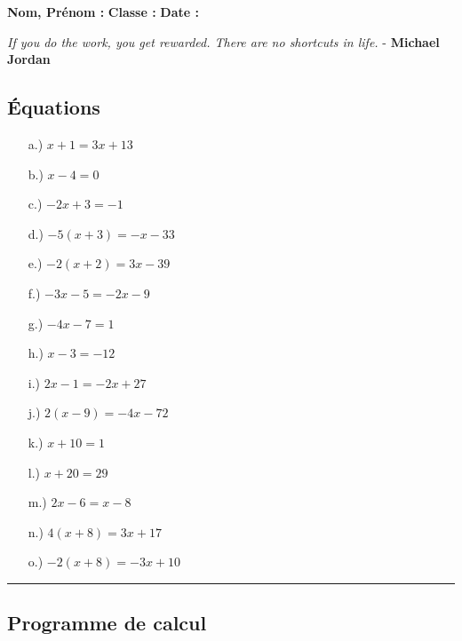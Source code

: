 \documentclass[11pt]{article}
\newcommand{\horrule}[1]{\rule{\linewidth}{#1}} %
\begin{document}
\newpage

\textbf{Nom, Prénom :} \hspace{8cm} \textbf{Classe :} \hspace{3cm} \textbf{Date :}\\
\vspace{-0.8cm}
\begin{center}
  \textit{If you do the work, you get rewarded. There are no shortcuts in life.}  - \textbf{Michael Jordan}
\end{center}
\vspace{-0.8cm}

\subsection*{Équations}
\begin{multicols}{3}\noindent
  \begin{enumerate}
  \item[a.)] $x + 1 = 3x + 13$
  \item[b.)] $x - 4 = 0$
  \item[c.)] $-2x + 3 = -1$
  \item[d.)] $-5(x + 3) = -x - 33$
  \item[e.)] $-2(x + 2) = 3x - 39$
  \item[f.)] $-3x - 5 = -2x - 9$
  \item[g.)] $-4x - 7 = 1$
  \item[h.)] $x - 3 = -12$
  \item[i.)] $2x - 1 = -2x + 27$
  \item[j.)] $2(x - 9) = -4x - 72$
  \item[k.)] $x + 10 = 1$
  \item[l.)] $x + 20 = 29$
  \item[m.)] $2x - 6 = x - 8$
  \item[n.)] $4(x + 8) = 3x + 17$
  \item[o.)] $-2(x + 8) = -3x + 10$
  \end{enumerate}
\end{multicols}

\vspace{-0.4cm}
\horrule{1px}
\vspace{-0.8cm}

\subsection*{Programme de calcul}
\end{document}
